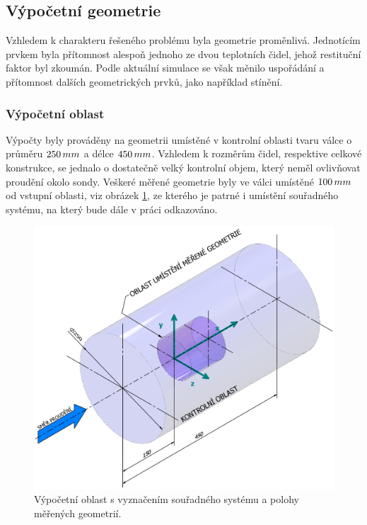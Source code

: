     \subsection{Výpočetní geometrie}
        Vzhledem k charakteru řešeného problému byla geometrie proměnlivá. Jednotícím prvkem byla přítomnost alespoň jednoho ze dvou teplotních čidel, jehož restituční faktor byl zkoumán. Podle aktuální simulace se však měnilo uspořádání a přítomnost dalších geometrických prvků, jako například stínění.
    
        \subsubsection{Výpočetní oblast}
            Výpočty byly prováděny na geometrii umístěné v kontrolní oblasti tvaru válce o průměru $250 \, mm$ a délce $450 \, mm$. Vzhledem k rozměrům čidel, respektive celkové konstrukce, se jednalo o dostatečně velký kontrolní objem, který neměl ovlivňovat proudění okolo sondy. Veškeré měřené geometrie byly ve válci umístěné $100 \, mm$ od vstupní oblasti, viz obrázek \ref{fig:vypocetni-oblast}, ze kterého je patrné i umístění souřadného systému, na který bude dále v práci odkazováno.
            
            \begin{figure}[ht!]
                \centering
                \includegraphics[width=\textwidth]{300_VYPOCETNI_MODEL/Vypocetni_oblast.png}
                \caption{Výpočetní oblast s vyznačením souřadného systému a polohy měřených geometrií.}
                \label{fig:vypocetni-oblast}
            \end{figure}
        

